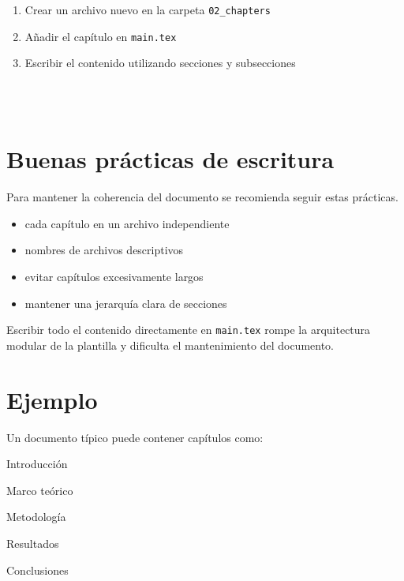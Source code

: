 \begin{enumerate}

\item Crear un archivo nuevo en la carpeta
\texttt{02\_chapters}

\item Añadir el capítulo en \texttt{main.tex}

\item Escribir el contenido utilizando secciones
y subsecciones

\end{enumerate}



\begin{lstlisting}[caption={Carga de capítulos en main.tex},label={code:chapters}]



\end{lstlisting}





\section{Buenas prácticas de escritura}

Para mantener la coherencia del documento se recomienda
seguir estas prácticas.

\begin{itemize}

\item cada capítulo en un archivo independiente
\item nombres de archivos descriptivos
\item evitar capítulos excesivamente largos
\item mantener una jerarquía clara de secciones

\end{itemize}



\begin{warningbox}
Escribir todo el contenido directamente en
\texttt{main.tex} rompe la arquitectura modular
de la plantilla y dificulta el mantenimiento
del documento.
\end{warningbox}




\section{Ejemplo}

\begin{examplebox}
Un documento típico puede contener capítulos como:

Introducción

Marco teórico

Metodología

Resultados

Conclusiones
\end{examplebox}
